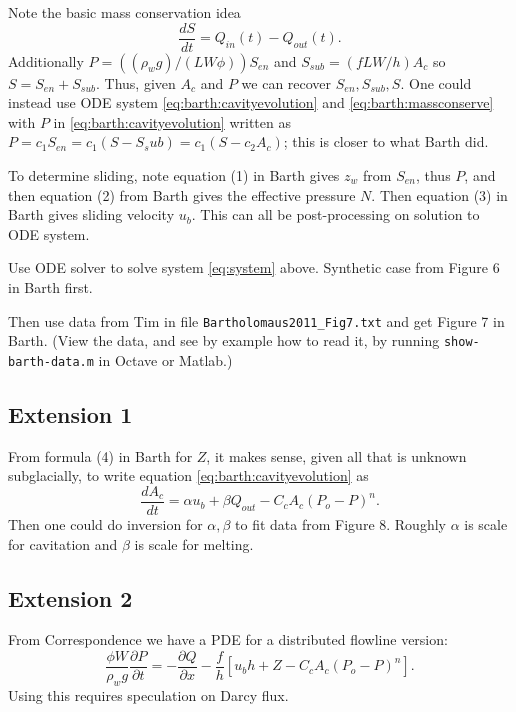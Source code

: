\documentclass[11pt,final]{amsart}%
\begin{document}
Note the basic mass conservation idea
\begin{equation}
\frac{dS}{dt} = Q_{in}(t) - Q_{out}(t). \label{eq:barth:massconserve}
\end{equation}
Additionally $P = ((\rho_w g)/(LW\phi)) S_{en}$ and $S_{sub} = (fLW/h) A_c$ so $S = S_{en} + S_{sub}$.  Thus, given $A_c$ and $P$ we can recover $S_{en},S_{sub},S$.  One could instead use ODE system \eqref{eq:barth:cavityevolution} and \eqref{eq:barth:massconserve} with $P$ in \eqref{eq:barth:cavityevolution} written as $P= c_1 S_{en} = c_1 (S - S_sub) = c_1 (S - c_2 A_c)$; this is closer to what Barth did.

To determine sliding, note equation (1) in Barth gives $z_w$ from $S_{en}$, thus $P$, and then equation (2) from Barth gives the effective pressure $N$.  Then equation (3) in Barth gives sliding velocity $u_b$.  This can all be post-processing on solution to ODE system.

Use ODE solver to solve system \eqref{eq:system} above.  Synthetic case from Figure 6 in Barth first.

Then use data from Tim in file \texttt{Bartholomaus2011_Fig7.txt} and get Figure 7 in Barth.  (View the data, and see by example how to read it, by running \texttt{show-barth-data.m} in Octave or Matlab.)

\subsection*{Extension 1}  From formula (4) in Barth for $Z$, it makes sense, given all that is unknown subglacially, to write equation \eqref{eq:barth:cavityevolution} as
\begin{equation*}
\frac{dA_c}{dt} = \alpha u_b + \beta Q_{out} - C_c A_c (P_o-P)^n.
\end{equation*}
Then one could do inversion for $\alpha,\beta$ to fit data from Figure 8.  Roughly $\alpha$ is scale for cavitation and $\beta$ is scale for melting.

\subsection*{Extension 2}  From Correspondence \citep{Bueler2014correspondence} we have a PDE for a distributed flowline version:
\begin{equation}
\frac{\phi W}{\rho_w g} \frac{\partial P}{\partial t} = - \frac{\partial Q}{\partial x} - \frac{f}{h} \left[u_b h + Z - C_c A_c (P_o-P)^n\right]. \label{eq:barth:distpressure}
\end{equation}
Using this requires speculation on Darcy flux.
\end{document}
